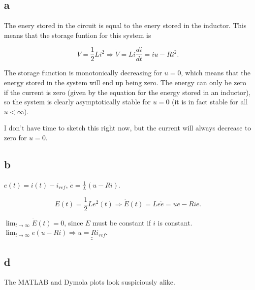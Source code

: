 \documentclass{article}
\begin{document}
\subsection{a}

The enery stored in the circuit is equal to the enery stored in the inductor. This means that the storage funtion for this system is 

\begin{equation*}
    V = \frac{1}{2} L i^2 \Rightarrow \dot V = Li\frac{di}{dt} = iu - Ri^2.
\end{equation*}

The storage function is monotonically decreasing for $u = 0$, which means that the energy stored in the system will end up being zero. The energy can only be zero if the current is zero (given by the equation for the energy stored in an inductor), so the system is clearly asymptotically stable for $u = 0$ (it is in fact stable for all $u < \infty$). 

I don't have time to sketch this right now, but the current will always decrease to zero for $u = 0$.

\subsection{b}

$e(t) = i(t) - i_{ref}$, $\dot e = \frac{1}{L}(u - Ri)$. 

\begin{equation*}
    E(t) = \frac{1}{2}Le^2(t) \Rightarrow \dot E(t) = Le\dot e = ue - Rie.
\end{equation*} 

$\lim_{t\to \infty} \dot E (t) = 0$, since $E$ must be constant if $i$ is constant. $\lim_{t\to \infty} e(u - Ri) \Rightarrow \underline{\underline{u = Ri_{ref}}}$.

\subsection{d}

The MATLAB and Dymola plots look suspiciously alike.
\end{document}
